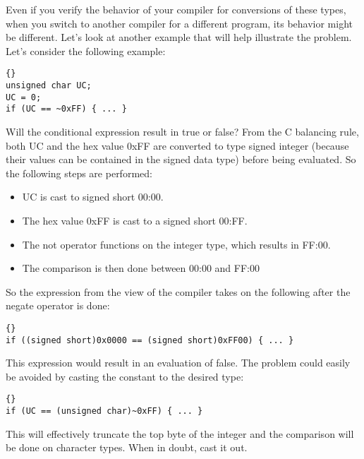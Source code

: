 \documentclass{report}
\begin{document}
Even if you verify the behavior of your compiler for conversions of these types, when you switch to another compiler for a different program, its behavior might be different. Let's look at another example that will help illustrate the problem. 
Let's consider the following example:
\begin{lstlisting}{}
unsigned char UC;
UC = 0;
if (UC == ~0xFF) { ... } 
\end{lstlisting}
Will the conditional expression result in true or false? 
From the C balancing rule, both UC and the hex value 0xFF are converted to type signed integer (because their values can be contained in the signed data type) before being evaluated. So the following steps are performed:
\begin{itemize}
\item UC is cast to signed short 00:00.
\item The hex value 0xFF is cast to a signed short 00:FF.
\item The not operator functions on the integer type, which results in FF:00.
\item The comparison is then done between 00:00 and FF:00
\end{itemize}
So the expression from the view of the compiler takes on the following after the negate operator is done: 
\begin{lstlisting}{}
if ((signed short)0x0000 == (signed short)0xFF00) { ... }
\end{lstlisting}
This expression would result in an evaluation of false. The problem could easily be avoided by casting the constant to the desired type: 
\begin{lstlisting}{}
if (UC == (unsigned char)~0xFF) { ... }
\end{lstlisting}
This will effectively truncate the top byte of the integer and the comparison will be done on character types. When in doubt, cast it out. 


\end{document}
